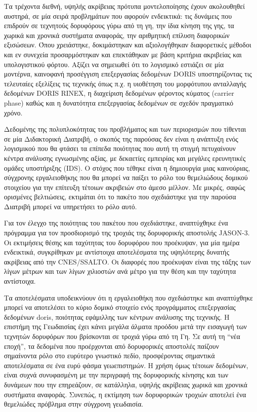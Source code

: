 Τα τρέχοντα διεθνή, υψηλής ακρίβειας πρότυπα μοντελοποίησης έχουν ακολουθηθεί αυστηρά, σε μία
σειρά προβλημάτων που αφορούν ενδεικτικά: τις δυνάμεις που επιδρούν σε τεχνητούς δορυφόρους γύρω
από τη γη, την ίδια κίνηση της γης, τα χωρικά και χρονικά συστήματα αναφοράς, την αριθμητική επίλυση
διαφορικών εξισώσεων. Όπου χρειάστηκε, δοκιμάστηκαν και αξιολογήθηκαν διαφορετικές μέθοδοι και
εν συνεχεία προσαρμόστηκαν και επεκτάθηκαν με βάση κριτήρια ακριβείας και υπολογιστικού φόρτου.
Αξίζει να σημειωθεί ότι το λογισμικό εστιάζει σε μία μοντέρνα, καινοφανή προσέγγιση επεξεργασίας
δεδομένων \textlatin{DORIS} υποστηρίζοντας τις τελευταίες εξελίξεις τις τεχνικής όπως π.χ. η υιοθέτηση
του μορφότυπου ανταλλαγής δεδομένων \textlatin{DORIS RINEX}, η διαχείριση δεδομένων φέροντος
κύματος (\textlatin{carrier phase}) καθώς και η δυνατότητα επεξεργασίας δεδομένων σε σχεδόν
πραγματικό χρόνο.


Δεδομένης της πολυπλοκότητας του προβλήματος και των περιορισμών που τίθενται σε μία Διδακτορική
Διατριβή, ο σκοπός της παρούσας δεν είναι η ανάπτυξη ενός λογισμικού που θα φτάσει τα επίπεδα
ποιότητας που αυτή τη στιγμή πετυχαίνουν κέντρα ανάλυσης εγνωσμένης αξίας, με δεκαετίες εμπειρίας
και μεγάλες ερευνητικές ομάδες υποστήριξης (\textlatin{IDS}). Ο στόχος που τέθηκε είναι η δημιουργία
μιας καινούριας, σύγχρονης εργαλειοθήκης που θα μπορεί να παίξει το ρόλο του θεμελιώδους δομικού
στοιχείου για την επίτευξη τέτοιων ακριβειών στο άμεσο μέλλον. Με μικρές, σαφώς ορισμένες
βελτιώσεις, εκτιμάται ότι το πακέτο που σχεδιάστηκε για την παρούσα Διατριβή μπορεί να υπηρετήσει το
ρόλο αυτό.


Για τον έλεγχο της ποιότητας του πακέτου που σχεδιάστηκε, αναπτύχθηκε ένα πρόγραμμα για τον
προσδιορισμό της τροχιάς της δορυφορικής αποστολής \textlatin{JASON}-3. Οι εκτιμήσεις θέσης και
ταχύτητας του δορυφόρου που προέκυψαν, για μία ημέρα ενδεικτικά, συγκρίθηκαν με αντίστοιχα
αποτελέσματα της υψηλότερης δυνατής ακρίβειας από την \textlatin{CNES/SSALTO}. Οι διαφορές που
προέκυψαν είναι της τάξης των λίγων μέτρων και των λίγων χιλιοστών ανά μέτρο για την θέση και την
ταχύτητα αντίστοιχα.


Τα αποτελέσματα υποδεικνύουν ότι η εργαλειοθήκη που σχεδιάστηκε και αναπτύχθηκε μπορεί να
αποτελέσει το κύριο δομικό στοιχείο ενός προγράμματος επεξεργασίας δεδομένων \textlatin{doris},
ποιότητας εφάμιλλης των κέντρων ανάλυσης της τεχνικής.
\iffalse
Η επιστήμη της Γεωδαισίας έχει κάνει μεγάλα άλματα προόδου μετά την εισαγωγή των τεχνητών δορυφόρων
που βρίσκονται σε τροχιά γύρω από τη Γη. Σε αυτή τη ``νέα εποχή'', τα δεδομένα που προέρχονται
από δορυφορικές αποστολές παίζουν σημαίνοντα ρόλο στο ευρύτερο γνωστικό πεδίο, προσφέροντας
σημαντικά αποτελέσματα σε ένα ευρύ φάσμα γεωεπιστημών. Η χρήση όμως τέτοιων δεδομένων, είναι συχνά
συνυφασμένη με την περιγραφή της δορυφορικής κίνησης και των δυνάμεων που την επηρεάζουν,
σε κατάλληλα, υψηλής ακρίβειας χωρικά και χρονικά συστήματα αναφοράς. Συνεπώς, η εκτίμηση
των δορυφορικών τροχιών αποτελεί ένα θεμελιώδες πρόβλημα στην σύγχρονη γεωδαισία.

